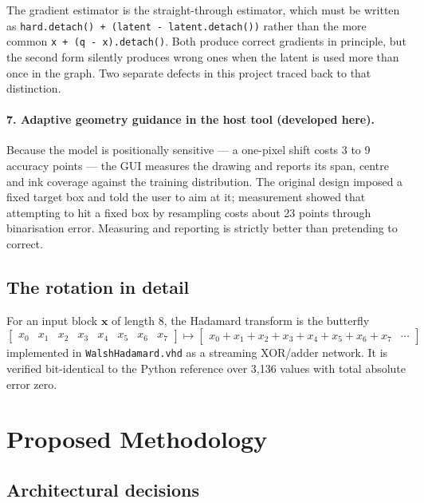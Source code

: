 \documentclass[11pt,a4paper]{article}
\begin{document}
The gradient estimator is the straight-through estimator, which must be written
as \texttt{hard.detach() + (latent - latent.detach())} rather than the more
common \texttt{x + (q - x).detach()}. Both produce correct gradients in
principle, but the second form silently produces wrong ones when the latent is
used more than once in the graph. Two separate defects in this project traced
back to that distinction.

\paragraph{7. Adaptive geometry guidance in the host tool (developed here).}
Because the model is positionally sensitive --- a one-pixel shift costs 3 to 9
accuracy points --- the GUI measures the drawing and reports its span, centre
and ink coverage against the training distribution. The original design imposed
a fixed target box and told the user to aim at it; measurement showed that
attempting to hit a fixed box by resampling costs about 23 points through
binarisation error. Measuring and reporting is strictly better than pretending
to correct.

\subsection{The rotation in detail}

For an input block $\mathbf{x}$ of length 8, the Hadamard transform is the
butterfly
\[
\begin{bmatrix}
x_0 & x_1 & x_2 & x_3 & x_4 & x_5 & x_6 & x_7
\end{bmatrix}
\mapsto
\begin{bmatrix}
x_0{+}x_1{+}x_2{+}x_3{+}x_4{+}x_5{+}x_6{+}x_7 & \cdots
\end{bmatrix}
\]
implemented in \texttt{WalshHadamard.vhd} as a streaming XOR/adder network. It
is verified bit-identical to the Python reference over 3{,}136 values with total
absolute error zero.
\section{Proposed Methodology}
\label{sec:pipeline}

\subsection{Architectural decisions}
\end{document}
